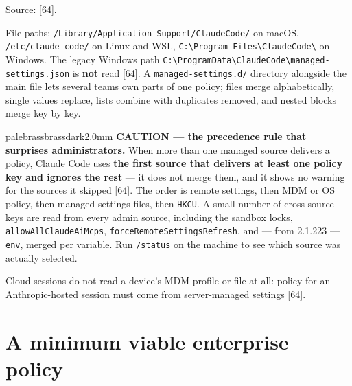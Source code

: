 \documentclass[11pt,a4paper,twoside,openany]{book}
\begin{document}
Source: [64].


File paths: \texttt{/\allowbreak{}Library/\allowbreak{}Application\allowbreak{} Support/\allowbreak{}Claude\allowbreak{}Code/\allowbreak{}} on macOS, \texttt{/\allowbreak{}etc/\allowbreak{}claude-\allowbreak{}code/\allowbreak{}} on Linux and WSL, \texttt{C:\allowbreak{}\textbackslash{}Program Fil\allowbreak{}es\textbackslash{}Claude\allowbreak{}Code\textbackslash{}} on Windows. The legacy Windows path \texttt{C:\allowbreak{}\textbackslash{}Program\allowbreak{}Data\textbackslash{}Claude\allowbreak{}Code\textbackslash{}managed-\allowbreak{}settings.\allowbreak{}json} is \textbf{not} read [64]. A \texttt{managed-\allowbreak{}settings.\allowbreak{}d/\allowbreak{}} directory alongside the main file lets several teams own parts of one policy; files merge alphabetically, single values replace, lists combine with duplicates removed, and nested blocks merge key by key.


\begin{calloutbox}{palebrass}{brassdark}{2.0mm}
\textbf{CAUTION — the precedence rule that surprises administrators.} When more than one managed source delivers a policy, Claude Code uses \textbf{the first source that delivers at least one policy key and ignores the rest} — it does not merge them, and it shows no warning for the sources it skipped [64]. The order is remote settings, then MDM or OS policy, then managed settings files, then \texttt{HKCU}. A small number of cross-source keys are read from every admin source, including the sandbox locks, \texttt{allow\allowbreak{}All\allowbreak{}Claude\allowbreak{}Ai\allowbreak{}Mcps}, \texttt{force\allowbreak{}Remote\allowbreak{}Settings\allowbreak{}Refresh}, and — from 2.1.223 — \texttt{env}, merged per variable. Run \texttt{/\allowbreak{}status} on the machine to see which source was actually selected.
\end{calloutbox}

Cloud sessions do not read a device's MDM profile or file at all: policy for an Anthropic-hosted session must come from server-managed settings [64].


\FloatBarrier
\setcounter{section}{1}
\section{A minimum viable enterprise policy}
\end{document}
